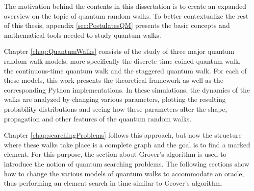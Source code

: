 \documentclass[../../dissertation.tex]{subfiles}
\begin{document}
The motivation behind the contents in this dissertation is to create an
expanded overview on  the topic of quantum random walks. To better
contextualize the rest of this thesis, appendix \ref{sec:PostulatesQM} presents
the basic concepts and mathematical tools needed to study quantum walks. \par

Chapter \ref{chap:QuantumWalks} consists of the study of three major quantum
random walk models, more specifically the discrete-time coined quantum walk,
the continuous-time quantum walk and the staggered quantum walk. For each of
these models, this work presents the theoretical framework as well as the corresponding Python
implementations. In these simulations, the dynamics of the walks are analyzed
by changing various parameters, plotting the resulting probability
distributions and seeing how these parameters alter the shape, propagation and
other features of the quantum random walks.\par

Chapter \ref{chap:searchingProblems} follows this approach, but now the
structure where these walks take place is a complete graph and the goal is to
find a marked element. For this purpose, the section about Grover's algorithm
is used to introduce the notion of quantum searching problems. The following
sections show how to change the various models of quantum walks to accommodate
an oracle, thus performing an element search in time similar to Grover's
algorithm. \par
\end{document}
